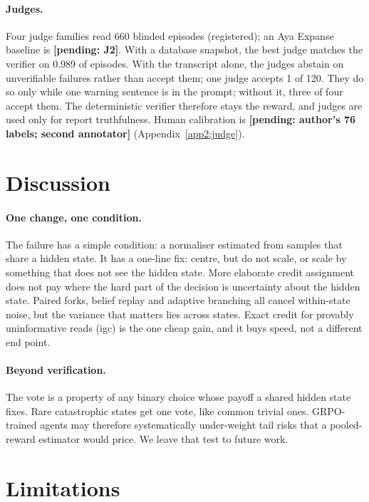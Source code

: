 \documentclass[11pt]{article}
\newcommand{\pend}[1]{\textbf{[pending: #1]}}
\begin{document}
\paragraph{Judges.} Four judge families read 660 blinded episodes (registered); an Aya Expanse baseline is
\pend{J2}. With a database snapshot, the best judge matches the verifier on 0.989 of episodes. With the transcript
alone, the judges abstain on unverifiable failures rather than accept them; one judge accepts 1 of 120. They do so
only while one warning sentence is in the prompt; without it, three of four accept them. The deterministic verifier therefore stays the reward, and judges are used
only for report truthfulness. Human calibration is \pend{author's 76 labels; second annotator}
(Appendix~\ref{app2:judge}).

\section{Discussion}

\paragraph{One change, one condition.} The failure has a simple condition: a normaliser estimated from samples that
share a hidden state. It has a one-line fix: centre, but do not scale, or scale by something that does not see the
hidden state. More elaborate credit assignment does not pay where the hard part of the decision is uncertainty about
the hidden state. Paired forks, belief replay and adaptive branching all cancel within-state noise, but the variance
that matters lies across states. Exact credit for provably uninformative reads (igc) is the one cheap gain, and it
buys speed, not a different end point.

\paragraph{Beyond verification.} The vote is a property of any binary choice whose payoff a shared hidden state
fixes. Rare catastrophic states get one vote, like common trivial ones. GRPO-trained agents may therefore
systematically under-weight tail risks that a pooled-reward estimator would price. We leave that test to future
work.

\section*{Limitations}
\end{document}
